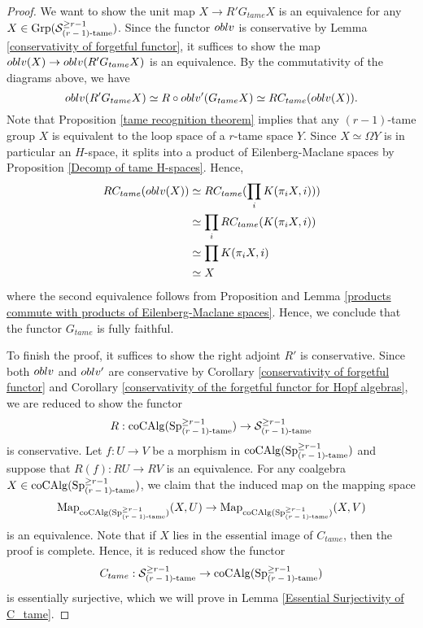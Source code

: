 \begin{proof}
We want to show the unit map $X \to R' G_{tame}X$ is an equivalence for any $X\in \operatorname{Grp}({\mathcal{S}}^{\geq r-1}_{\text{($r-1$)-tame}})$.
Since the functor $oblv$ is conservative by Lemma \ref{conservativity of forgetful functor}, it suffices to show the map $oblv(X) \to oblv(R'G_{tame}X)$ is an equivalence.
By the commutativity of the diagrams above, we have
$$
oblv(R'G_{tame}X) \simeq R \circ oblv'(G_{tame}X)\simeq RC_{tame}(oblv(X)).
$$
	Note that Proposition \ref{tame recognition theorem} implies that any  $(r-1)$-tame group $X$ is equivalent to the loop space of a $r$-tame space $Y$. Since $X\simeq \Omega Y$ is in particular an $H$-space, it splits into a product of Eilenberg-Maclane spaces by Proposition \ref{Decomp of tame H-spaces}. Hence, 
		\begin{align*}
		RC_{tame}(oblv(X)) & \simeq RC_{tame}(\prod_{i} K(\pi_i X, i)))\\
		& \simeq \prod_{i} RC_{tame}(K(\pi_i X, i))\\
		& \simeq \prod K(\pi_i X, i)\\
		& \simeq X
	\end{align*}
	where the second equivalence follows from Proposition  and Lemma \ref{products commute with products of Eilenberg-Maclane spaces}.
	Hence, we conclude that the functor $G_{tame}$ is fully faithful.
	
	To finish the proof, it suffices to show the right adjoint $R'$ is conservative. 
	Since both $oblv$ and $oblv'$ are conservative by Corollary \ref{conservativity of forgetful functor} and Corollary \ref{conservativity of the forgetful functor for Hopf algebras}, we are reduced to show the functor 
	\[
	R: \operatorname{coCAlg}(\operatorname{Sp}^{\geq r-1}_{\text{($r-1$)-tame}}) \to 
	{\mathcal{S}}^{\geq r-1}_{\text{($r-1$)-tame}}
	\]
	is conservative. Let $f:U\to V$ be a morphism in $\operatorname{coCAlg}(\operatorname{Sp}^{\geq r-1}_{\text{($r-1$)-tame}})$ and suppose that $R(f): RU\to RV$ is an equivalence.
	For any coalgebra $X\in \operatorname{coCAlg}(\operatorname{Sp}^{\geq r-1}_{\text{($r-1$)-tame}})$, we claim that the induced map on the mapping space
	$$
	\operatorname{Map}_{\operatorname{coCAlg}(\operatorname{Sp}^{\geq r-1}_{\text{($r-1$)-tame}})}(X, U)\to 
	\operatorname{Map}_{\operatorname{coCAlg}(\operatorname{Sp}^{\geq r-1}_{\text{($r-1$)-tame}})}(X, V)
	$$
	is an equivalence.
	Note that if $X$ lies in the essential image of $C_{tame}$, then the proof is complete. Hence, it is reduced show the functor
	$$
	C_{tame}: {\mathcal{S}}^{\geq r-1}_{\text{($r-1$)-tame}}  
	\to 
	\operatorname{coCAlg}(\operatorname{Sp}^{\geq r-1}_{\text{($r-1$)-tame}})
	$$
	is essentially surjective, which we will prove in Lemma \ref{Essential Surjectivity of C_tame}.
	
\end{proof}






